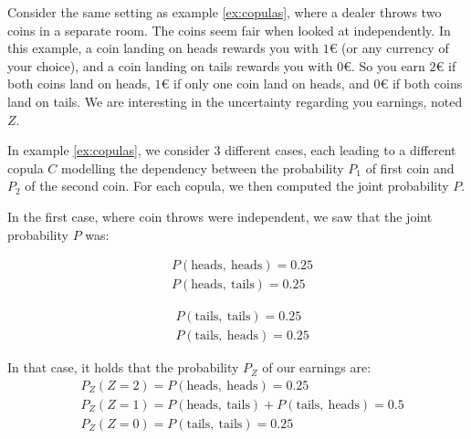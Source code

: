 \begin{example}\label{ex:propagated_probability}
    Consider the same setting as example \ref{ex:copulas}, where a dealer throws two coins in a separate room. The coins seem fair when looked at independently. In this example, a coin landing on heads rewards you with $1$€ (or any currency of your choice), and a coin landing on tails rewards you with $0$€. So you earn $2$€ if both coins land on heads, $1$€ if only one coin land on heads, and $0$€ if both coins land on tails. We are interesting in the uncertainty regarding you earnings, noted $Z$.
    
    In example \ref{ex:copulas}, we consider $3$ different cases, each leading to a different copula $C$ modelling the dependency between the probability $P_1$ of first coin and $P_2$ of the second coin. For each copula, we then computed the joint probability $P$.
    
    In the first case, where coin throws were independent, we saw that the joint probability $P$ was:\\
    \begin{minipage}[b]{0.5\linewidth}
    \begin{align*}
        & P(\text{heads}, ~\text{heads}) = 0.25\\
        & P(\text{heads}, ~\text{tails}) = 0.25
    \end{align*}
    \end{minipage}
    \begin{minipage}[b]{0.5\linewidth}
    \begin{align*}
        & P(\text{tails}, ~\text{tails}) = 0.25 \\
        & P(\text{tails}, ~\text{heads}) = 0.25
    \end{align*}
    \end{minipage}
    In that case, it holds that the probability $P_Z$ of our earnings are:
    \begin{align*}
        & P_Z(Z=2) = P(\text{heads}, ~\text{heads}) = 0.25\\
        & P_Z(Z=1) = P(\text{heads}, ~\text{tails}) + P(\text{tails}, ~\text{heads}) = 0.5 \\
        & P_Z(Z=0) = P(\text{tails}, ~\text{tails}) = 0.25
    \end{align*}
    

\end{example}
